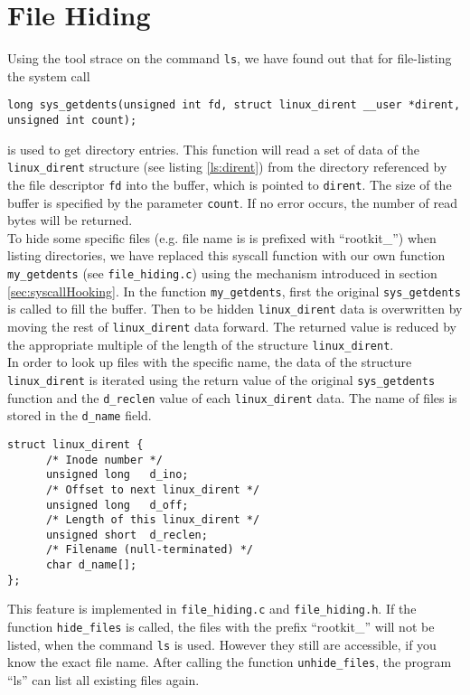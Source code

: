 \section{File Hiding}
Using the tool strace on the command \texttt{ls}, we have found out that for file-listing the system call 
\lstset{escapechar=,style=customc}
\begin{lstlisting}
long sys_getdents(unsigned int fd, struct linux_dirent __user *dirent, unsigned int count);
\end{lstlisting}
is used to get directory entries. This function will read a set of data of the \verb+linux_dirent+ structure (see listing \ref{ls:dirent}) from the directory referenced by the file descriptor \texttt{fd} into the buffer, which is pointed to \texttt{dirent}. The size of the buffer is specified by the parameter \texttt{count}. If no error occurs, the number of read bytes will be returned.\\
To hide some specific files (e.g. file name is is prefixed with ``rootkit\_'') when listing directories, we have replaced this syscall function with our own function \verb+my_getdents+ (see \verb+file_hiding.c+) using the mechanism introduced in section \ref{sec:syscallHooking}. In the function \verb+my_getdents+, first the original \verb+sys_getdents+ is called to fill the buffer. Then to be hidden \verb+linux_dirent+ data is overwritten by moving the rest of \verb+linux_dirent+ data forward. The returned value is reduced by the appropriate multiple of the length of the structure \verb+linux_dirent+.\\ 
In order to look up files with the specific name, the data of the structure \verb+linux_dirent+ is iterated using the return value of the original \verb+sys_getdents+ function and the \verb+d_reclen+ value of each \verb+linux_dirent+ data. The name of files is stored in the \verb+d_name+ field. 
\lstset{escapechar=,style=customc}
\begin{lstlisting}[captionpos=b, caption={The \texttt{linux\_dirent} structure defined in \texttt{/fs/readdir.c}}, label={ls:dirent}]
struct linux_dirent {
      /* Inode number */
      unsigned long   d_ino;
      /* Offset to next linux_dirent */
      unsigned long   d_off;
      /* Length of this linux_dirent */
      unsigned short  d_reclen; 
      /* Filename (null-terminated) */
      char d_name[];
};
\end{lstlisting}
This feature is implemented in \verb+file_hiding.c+ and \verb+file_hiding.h+. If the function \verb+hide_files+ is called, the files with the prefix ``rootkit\_'' will not be listed, when the command \texttt{ls} is used. However they still are accessible, if you know the exact file name. After calling the function \verb+unhide_files+, the program ``ls'' can list all existing files again. 
